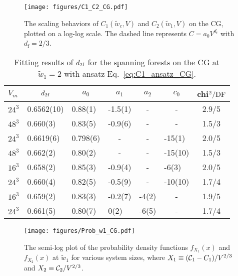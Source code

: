 \begin{figure}[ht]
	\centering
	\vspace{3ex}
	\texttt{[image: figures/C1\_C2\_CG.pdf]}
	\caption{The scaling behaviors of $C_1(\tilde{w}_c, V)$ and $C_2(\tilde{w}_1, V)$ on the CG, plotted on a log-log scale. The dashed line 
	represents $C = a_0 V^{d_{\text{f}}}$ with $d_\text{f} = 2/3$.}
	\label{fig:C1_C2_CG}
\end{figure}

\begin{table}[tb]
\centering
\vspace{3ex}
\caption{Fitting results of ${d_{2\textrm{f}}}$ for the spanning forests on the CG at $\tilde{w}_1 = 2$ with ansatz Eq.~\eqref{eq:C1_ansatz_CG}.}
\label{tab:C2_w1_COM} 
\begin{tabular}{|llllllc|}
\hline 
$V_{m}$   &\multicolumn{1}{c}{${d_{2\textrm{f}}}$}   &\multicolumn{1}{c}{$a_0$}    
&\multicolumn{1}{c}{$a_1$}  &\multicolumn{1}{c}{$a_2$} &\multicolumn{1}{c}{$c_0$}
& chi$^2/{\rm DF}$     \\
\hline 
$24^3$    &0.6562(10)   &0.88(1)    &-1.5(1)    &\multicolumn{1}{c}{-} &\multicolumn{1}{c}{-}      &2.9/5\\ 
$48^3$    &0.660(3)     &0.83(5)    &-0.9(6)    &\multicolumn{1}{c}{-} &\multicolumn{1}{c}{-}      &1.5/3\\ 

$24^3$    &0.6619(6)    &0.798(6)   &\multicolumn{1}{c}{-} &\multicolumn{1}{c}{-}      &-15(1)     &2.0/5\\ 
$48^3$    &0.662(2)     &0.80(2)    &\multicolumn{1}{c}{-} &\multicolumn{1}{c}{-}      &-15(10)    &1.5/3\\ 

$16^3$    &0.658(2)     &0.85(3)    &-0.9(4)    &\multicolumn{1}{c}{-}     &-6(3)      &2.0/5\\ 
$24^3$    &0.660(4)     &0.82(5)    &-0.5(9)    &\multicolumn{1}{c}{-}     &-10(10)    &1.7/4\\ 

$16^3$    &0.659(2)     &0.83(3)    &-0.2(7)     &-4(2)       &\multicolumn{1}{c}{-}      &1.9/5\\ 
$24^3$    &0.661(5)     &0.80(7)    &0(2)        &-6(5)       &\multicolumn{1}{c}{-}      &1.7/4\\ 
\hline 
\end{tabular} 
\vspace{3ex}
\end{table} 


\begin{figure}[b]
	\centering
	\texttt{[image: figures/Prob\_w1\_CG.pdf]}
	\caption{The semi-log plot of the probability density functions $f_{X_1}(x)$ and $f_{X_2}(x)$ at $\tilde{w}_1$ for various system sizes,
	where $X_1 \equiv ({\mathcal C}_1 - C_1)/V^{2/3}$ and $X_2 \equiv {\mathcal C}_2/V^{2/3}$.}
	\label{fig:prob_w1_CG}
\end{figure}

